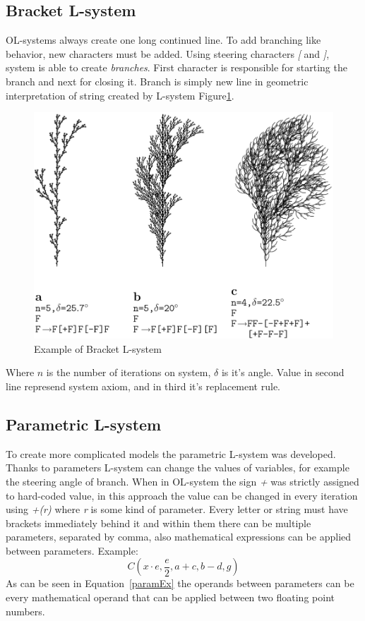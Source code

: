 \documentclass[b5paper,twoside,11pt]{article}
\renewcommand{\figurename}{Figure}
\begin{document}
\subsection{Bracket L-system}
OL-systems always create one long continued line. To add branching like behavior, new characters must be added. Using steering characters \textit{[} and \textit{]}, system is able to create \textit{branches}. First character is responsible for starting the branch and next for closing it. Branch is simply new line in geometric interpretation of string created by L-system \figurename\ref{branchingL}.
\begin{figure}[!htp]
\centering
  \includegraphics[width=0.7\linewidth]{branchingL}
\caption{Example of Bracket L-system\cite{prusinABOP} \label{branchingL}}
\end{figure}
\FloatBarrier
Where $n$ is the number of iterations on system, $\delta$ is it's angle. Value in second line represend system axiom, and in third it's replacement rule.




\subsection{Parametric L-system}
To create more complicated models the parametric L-system was developed. Thanks to parameters L-system can change the values of variables, for example the steering angle of branch. When in OL-system the sign \textit{+} was strictly assigned to hard-coded value, in this approach the value can be changed in every iteration using \textit{+(r)} where \textit{r} is some kind of parameter. Every letter or string must have brackets immediately behind it and within them there can be multiple parameters, separated by comma, also mathematical expressions can be applied between parameters. Example:
\begin{equation}\label{paramEx}
C(x\cdot e,\frac{e}{2},a+c,b-d,g)
\end{equation}
As can be seen in Equation~\ref{paramEx} the operands between parameters can be every mathematical operand that can be applied between two floating point numbers.
\end{document}
